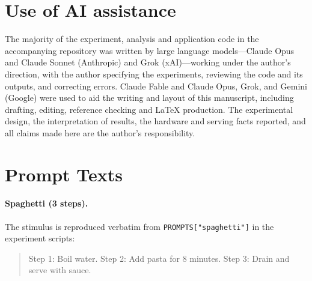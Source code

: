 \documentclass[11pt]{article}
\begin{document}
\section*{Use of AI assistance}
\label{sec:ai-disclosure}
The majority of the experiment, analysis and application code in the
accompanying repository was written by large language models---Claude Opus
and Claude Sonnet (Anthropic) and Grok (xAI)---working under the author's
direction, with the author specifying the experiments, reviewing the code
and its outputs, and correcting errors. Claude Fable and Claude Opus, Grok,
and Gemini (Google) were used to aid the writing and layout of this
manuscript, including drafting, editing, reference checking and LaTeX
production. The experimental design, the interpretation of results, the
hardware and serving facts reported, and all claims made here are the
author's responsibility.





\clearpage
\appendix

\section{Prompt Texts}
\label{app:prompts}

\paragraph{Spaghetti (3 steps).}
The stimulus is reproduced verbatim from \texttt{PROMPTS["spaghetti"]} in the
experiment scripts:
\begin{quote}
Step 1: Boil water. Step 2: Add pasta for 8 minutes. Step 3: Drain and serve
with sauce.
\end{quote}
\end{document}
